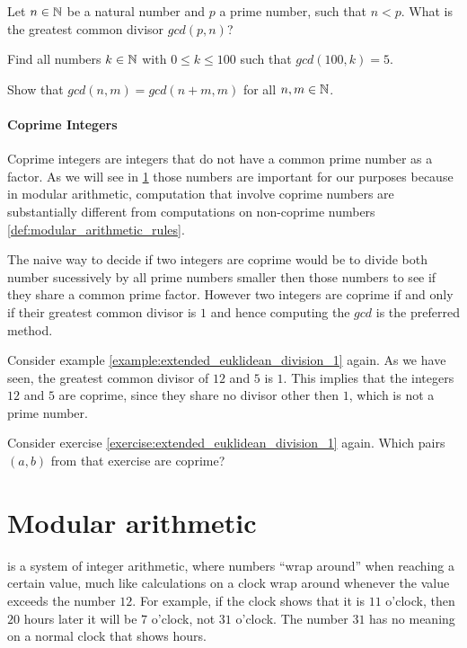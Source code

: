 \begin{exercise}
\label{exercise_towards_counting_numbers}
Let $n\in \mathbb{N}$ be a natural number and $p$ a prime number, such that $n<p$. What is the greatest common divisor $gcd(p,n)$?
\end{exercise}
\begin{exercise}
Find all numbers $k\in\mathbb{N}$ with $0\leq k \leq 100$ such that $gcd(100,k) = 5$.
\end{exercise}
\begin{exercise}
Show that $gcd(n,m) = gcd(n+m,m)$ for all $n,m\in\mathbb{N}$.
\end{exercise}
\paragraph{Coprime Integers}
\label{def:coprime_integers}
Coprime integers are integers that do not have a common prime number as a factor. As we will see in \ref{modular_arithmetic} those numbers are important for our purposes because in modular arithmetic, computation that involve coprime numbers are substantially different from computations on non-coprime numbers \ref{def:modular_arithmetic_rules}.

The naive way to decide if two integers are coprime would be to divide both number sucessively by all prime numbers smaller then those numbers to see if they share a common prime factor. However two integers are coprime if and only if their greatest common divisor is $1$ and hence computing the $gcd$ is the preferred method.

\begin{example} Consider example \ref{example:extended_euklidean_division_1} again. As we have seen, the greatest common divisor of $12$ and $5$ is $1$. This implies that the integers $12$ and $5$ are coprime, since they share no divisor other then $1$, which is not a prime number.
\end{example}
\begin{exercise} Consider exercise \ref{exercise:extended_euklidean_division_1} again. Which pairs $(a,b)$ from that exercise are coprime?
\end{exercise}
\section{Modular arithmetic}
\label{modular_arithmetic}
 is a system of integer arithmetic, where numbers ``wrap around'' when reaching a certain value, much like calculations on a clock wrap around whenever the value exceeds the number $12$. For example, if the clock shows that it is $11$ o'clock, then $20$ hours later it will be $7$ o'clock, not $31$ o'clock. The number $31$ has no meaning on a normal clock that shows hours.

